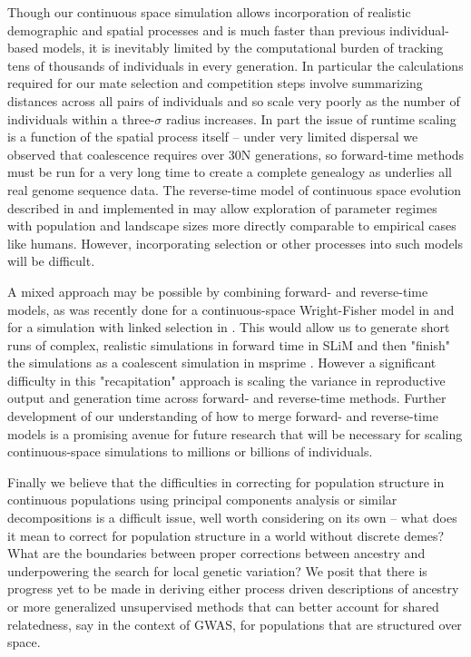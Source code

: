 \documentclass[11pt,twoside,lineno]{preprint}
\newif\ifcomments
\newcommand{\ak}[1]{\ifcomments{{\color{red} \it (#1)}}\else{}\fi}
\begin{document}
Though our continuous space simulation allows incorporation of realistic demographic and spatial processes and is much faster than previous individual-based models, it is inevitably limited by the computational burden of tracking tens of thousands of individuals in every generation. In particular the calculations required for our mate selection and competition steps involve summarizing distances across all pairs of individuals and so scale very poorly \ak{how exactly does this scale? $O(N^2)$?} as the number of individuals within a three-$\sigma$ radius increases. In part the issue of runtime scaling is a function of the spatial process itself -- under very limited dispersal we observed that coalescence requires over 30N generations, so forward-time methods must be run for a very long time to create a complete genealogy as underlies all real genome sequence data. The reverse-time model of continuous space evolution described in \cite{Barton2010} and implemented in \cite{Kelleher2014} may allow exploration of parameter regimes with population and landscape sizes more directly comparable to empirical cases like humans. However, incorporating selection or other processes into such models will be difficult. 

A mixed approach may be possible by combining forward- and reverse-time models, as was recently done for a continuous-space Wright-Fisher model in \cite{Lotterhos2019} and for a simulation with linked selection in \cite{Buffalo2019}. This would allow us to generate short runs of complex, realistic simulations in forward time in SLiM \citep{Haller2019} and then "finish" the simulations as a coalescent simulation in msprime \citep{Kelleher2016}. However a significant difficulty in this "recapitation" approach is scaling the variance in reproductive output and generation time across forward- and reverse-time methods. Further development of our understanding of how to merge forward- and reverse-time models is a promising avenue for future research that will be necessary for scaling continuous-space simulations to millions or billions of individuals.  

Finally we believe that the difficulties in correcting for population structure in continuous populations using principal components analysis or similar decompositions is a difficult issue, well worth considering on its own -- what does it mean to correct for population structure in a world without discrete demes? What are the boundaries between proper corrections between ancestry and underpowering the search for local genetic variation? We posit that there is progress yet to be made in deriving either process driven descriptions of ancestry or more generalized unsupervised methods that can better account for shared relatedness, say in the context of GWAS, for populations that are structured over space. 
\ak{this paragraph is a bit out there. rein me in}
\end{document}
